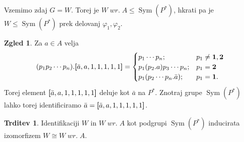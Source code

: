 \documentclass[11pt]{book}
\renewcommand{\wreath}{\; wr. \;}
\def\one{\mathbf{1}}
\def\two{\mathbf{2}}
\DeclareMathOperator\Sym{Sym}
\theoremstyle{definition}
\theoremstyle{zgled}
\newtheorem*{zgled}{Zgled}
\theoremstyle{odprtproblem}
\theoremstyle{domacanaloga}
\theoremstyle{izrek}
\newtheorem*{trditev}{Trditev}
\begin{document}
Vzemimo zdaj $G = W$. Torej je $W \wreath A \leq \Sym(P^*)$, hkrati pa je $W \leq \Sym(P^*)$ prek delovanj $\varphi_1, \varphi_2$.


\begin{zgled}
Za $a \in A$ velja
\[
(p_1 p_2 \cdots p_n).{\textbf [} \bar a, a, 1, 1, 1, 1, 1 {\textbf ]} =
\begin{cases}
p_1 \cdots p_n; & p_1 \neq \one, \two \\
p_1 (p_2.a) p_3 \cdots p_n; & p_1 = \two \\
p_1 (p_2 \cdots p_n.\bar a); & p_1 = \one.
\end{cases}
\]
Torej element ${\textbf [} \bar a, a, 1, 1, 1, 1, 1 {\textbf ]}$ deluje kot $\bar a$ na $P^*$. Znotraj grupe $\Sym(P^*)$ lahko torej identificiramo $\bar a = {\textbf [} \bar a, a, 1, 1, 1, 1, 1 {\textbf ]}$.
\end{zgled}


\begin{trditev}
Identifikaciji $W$ in $W \wreath A$ kot podgrupi $\Sym(P^*)$ inducirata izomorfizem $W \cong W \wreath A$.
\end{trditev}
\end{document}
